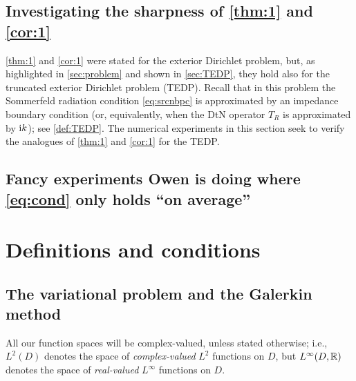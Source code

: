 \subsection{Investigating the sharpness of \cref{thm:1} and \cref{cor:1}}

\cref{thm:1} and \cref{cor:1} were stated for the exterior Dirichlet problem, but, as highlighted in \cref{sec:problem} and shown in \cref{sec:TEDP}, they hold also for the truncated exterior Dirichlet problem (TEDP). Recall that in this problem the Sommerfeld radiation condition \cref{eq:srcnbpc} is approximated by an impedance boundary condition (or, equivalently, when the DtN operator $T_R$ is approximated by $\mathrm{i} k$); see \cref{def:TEDP}. The numerical experiments in this section seek to verify the analogues of \cref{thm:1} and \cref{cor:1} for the TEDP.

\subsection{Fancy experiments Owen is doing where \cref{eq:cond} only holds ``on average''}


\section{Definitions and conditions}\label{sec:3}

\subsection{The variational problem and the Galerkin method}\label{sec:vpGm}

All our function spaces will be complex-valued, unless stated otherwise; i.e., $L^2(D)$ denotes the space of \emph{complex-valued} $L^2$ functions on $D$, but $L^\infty(D,\mathbb R)$ denotes the space of \emph{real-valued} $L^\infty$ functions on $D$.


